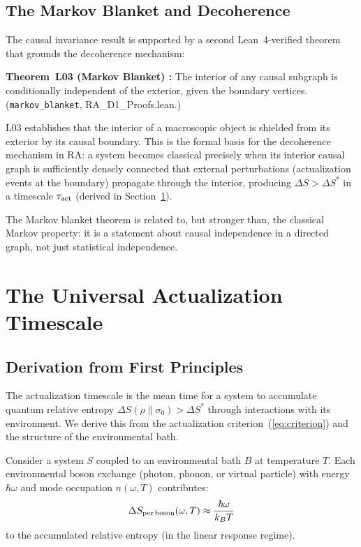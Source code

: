 \documentclass[12pt,a4paper]{article}
\begin{document}
\subsection{The Markov Blanket and Decoherence}

The causal invariance result is supported by a second Lean~4-verified theorem that grounds the decoherence mechanism:

\begin{leanbox}
\textbf{Theorem~L03 (Markov Blanket) \statusLV:}
The interior of any causal subgraph is conditionally independent of the exterior, given the boundary vertices.  (\texttt{markov\_blanket}, RA\_D1\_Proofs.lean.)
\end{leanbox}

L03 establishes that the interior of a macroscopic object is shielded from its exterior by its causal boundary.  This is the formal basis for the decoherence mechanism in RA: a system becomes classical precisely when its interior causal graph is sufficiently densely connected that external perturbations (actualization events at the boundary) propagate through the interior, producing $\Delta S>\Delta S^*$ in a timescale $\tau_{\rm act}$ (derived in Section~\ref{sec:tau}).

The Markov blanket theorem is related to, but stronger than, the classical Markov property: it is a statement about causal independence in a directed graph, not just statistical independence.

\section{The Universal Actualization Timescale}\label{sec:tau}

\subsection{Derivation from First Principles}

The actualization timescale is the mean time for a system to accumulate quantum relative entropy $\Delta S(\rho\|\sigma_0)>\Delta S^*$ through interactions with its environment.  We derive this from the actualization criterion~(\ref{eq:criterion}) and the structure of the environmental bath.

Consider a system $S$ coupled to an environmental bath $B$ at temperature $T$.  Each environmental boson exchange (photon, phonon, or virtual particle) with energy $\hbar\omega$ and mode occupation $n(\omega,T)$ contributes:
\begin{equation}
  \Delta S_{\rm per\,boson}(\omega,T) \approx \frac{\hbar\omega}{k_BT}
  \label{eq:dS_per_boson}
\end{equation}
to the accumulated relative entropy (in the linear response regime).
\end{document}
